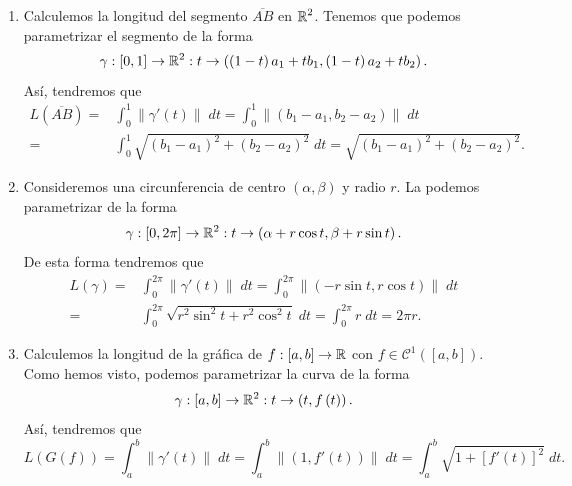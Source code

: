 \begin{eg}
\begin{enumerate}
\item Calculemos la longitud del segmento $\displaystyle \overline{AB} $ en $\displaystyle \mathbb{R}^{2} $. Tenemos que podemos parametrizar el segmento de la forma
	\[\gamma : \left[0,1\right] \to \mathbb{R}^{2} : t \to \left(\left(1-t\right)a_{1} + tb_{1}, \left(1-t\right)a_{2}+tb_{2}\right) .\]
	Así, tendremos que 
\[
\begin{split}
	L\left(\overline{AB}\right)= &\int^{1}_{0} \|\gamma'\left(t\right)\| \; dt = \int^{1}_{0} \|\left(b_{1}-a_{1}, b_{2}-a_{2}\right)\| \; dt\\
	= & \int^{1}_{0} \sqrt{\left(b_{1}-a_{1}\right)^{2}+\left(b_{2}-a_{2}\right)^{2}} \; dt = \sqrt{\left(b_{1}-a_{1}\right)^{2}+\left(b_{2}-a_{2}\right)^{2}}.
\end{split}
\]
\item Consideremos una circunferencia de centro $\displaystyle \left(\alpha, \beta \right) $ y radio $\displaystyle r $. La podemos parametrizar de la forma
	\[\gamma : \left[0,2\pi \right] \to \mathbb{R}^{2} : t \to \left(\alpha + r \cos t, \beta + r \sin t\right) .\]
	De esta forma tendremos que 
	\[
	\begin{split}
		L\left(\gamma \right)= & \int^{2\pi }_{0} \|\gamma'\left(t\right)\| \; dt = \int^{2\pi }_{0} \|\left(-r \sin t, r \cos t\right)\| \; dt \\
		= & \int^{2\pi }_{0} \sqrt{r^{2}\sin ^{2}t + r^{2}\cos ^{2}t} \; dt = \int^{2\pi }_{0} r \; dt = 2\pi r .
	\end{split}
	\]
\item Calculemos la longitud de la gráfica de $\displaystyle f : \left[a,b\right] \to \mathbb{R} $ con $\displaystyle f \in \mathcal{C}^{1}\left(\left[a,b\right] \right) $. Como hemos visto, podemos parametrizar la curva de la forma
	\[\gamma : \left[a,b\right] \to \mathbb{R}^{2} : t \to \left(t, f\left(t\right)\right) .\]
	Así, tendremos que 
	\[L\left(G\left(f\right)\right)=\int^{b}_{a} \|\gamma'\left(t\right)\| \; dt = \int^{b}_{a} \|\left(1, f'\left(t\right)\right)\| \; dt =\int^{b}_{a} \sqrt{1 + \left[f'\left(t\right)\right] ^{2}} \; dt .\]
\end{enumerate}
\end{eg}
